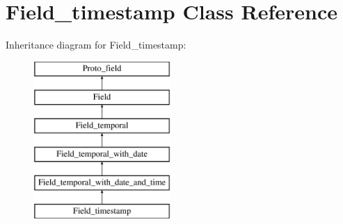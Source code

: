 \hypertarget{classField__timestamp}{}\section{Field\+\_\+timestamp Class Reference}
\label{classField__timestamp}
Inheritance diagram for Field\+\_\+timestamp\+:\begin{figure}[H]
\begin{center}
\leavevmode
\includegraphics[height=6.000000cm]{classField__timestamp}
\end{center}
\end{figure}
